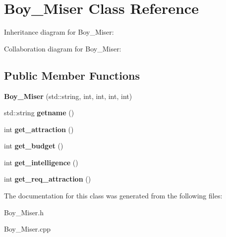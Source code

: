 \hypertarget{classBoy__Miser}{}\section{Boy\+\_\+\+Miser Class Reference}
\label{classBoy__Miser}


Inheritance diagram for Boy\+\_\+\+Miser\+:


Collaboration diagram for Boy\+\_\+\+Miser\+:
\subsection*{Public Member Functions}
\begin{DoxyCompactItemize}
\item 
{\bfseries Boy\+\_\+\+Miser} (std\+::string, int, int, int, int)\hypertarget{classBoy__Miser_a2269300569cc6c65d144f3cbdd6f3bfa}{}\label{classBoy__Miser_a2269300569cc6c65d144f3cbdd6f3bfa}

\item 
std\+::string {\bfseries getname} ()\hypertarget{classBoy__Miser_ac989d6ad1b56683bcd7ac7459eb9c7c6}{}\label{classBoy__Miser_ac989d6ad1b56683bcd7ac7459eb9c7c6}

\item 
int {\bfseries get\+\_\+attraction} ()\hypertarget{classBoy__Miser_a9e3b48e3e11aaec56a6689c134ec5044}{}\label{classBoy__Miser_a9e3b48e3e11aaec56a6689c134ec5044}

\item 
int {\bfseries get\+\_\+budget} ()\hypertarget{classBoy__Miser_a2365de51fb6f60ea19cd8390599de440}{}\label{classBoy__Miser_a2365de51fb6f60ea19cd8390599de440}

\item 
int {\bfseries get\+\_\+intelligence} ()\hypertarget{classBoy__Miser_aa3aaf35931f1c623676d4ec106b6b297}{}\label{classBoy__Miser_aa3aaf35931f1c623676d4ec106b6b297}

\item 
int {\bfseries get\+\_\+req\+\_\+attraction} ()\hypertarget{classBoy__Miser_a876ec8143c518863f8e4f3972eb19568}{}\label{classBoy__Miser_a876ec8143c518863f8e4f3972eb19568}

\end{DoxyCompactItemize}


The documentation for this class was generated from the following files\+:\begin{DoxyCompactItemize}
\item 
Boy\+\_\+\+Miser.\+h\item 
Boy\+\_\+\+Miser.\+cpp\end{DoxyCompactItemize}
